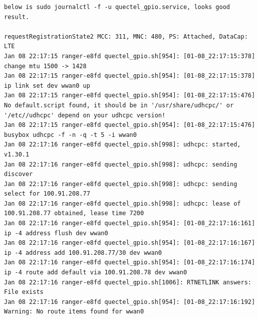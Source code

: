 \documentclass[paper=8.5in:11in, twoside, 12pt, pagesize=pdftex]{book}
\begin{document}
\begin{lstlisting}
below is sudo journalctl -f -u quectel_gpio.service, looks good result. 

requestRegistrationState2 MCC: 311, MNC: 480, PS: Attached, DataCap: LTE
Jan 08 22:17:15 ranger-e8fd quectel_gpio.sh[954]: [01-08_22:17:15:378] change mtu 1500 -> 1428
Jan 08 22:17:15 ranger-e8fd quectel_gpio.sh[954]: [01-08_22:17:15:378] ip link set dev wwan0 up
Jan 08 22:17:15 ranger-e8fd quectel_gpio.sh[954]: [01-08_22:17:15:476] No default.script found, it should be in '/usr/share/udhcpc/' or '/etc//udhcpc' depend on your udhcpc version!
Jan 08 22:17:15 ranger-e8fd quectel_gpio.sh[954]: [01-08_22:17:15:476] busybox udhcpc -f -n -q -t 5 -i wwan0
Jan 08 22:17:16 ranger-e8fd quectel_gpio.sh[998]: udhcpc: started, v1.30.1
Jan 08 22:17:16 ranger-e8fd quectel_gpio.sh[998]: udhcpc: sending discover
Jan 08 22:17:16 ranger-e8fd quectel_gpio.sh[998]: udhcpc: sending select for 100.91.208.77
Jan 08 22:17:16 ranger-e8fd quectel_gpio.sh[998]: udhcpc: lease of 100.91.208.77 obtained, lease time 7200
Jan 08 22:17:16 ranger-e8fd quectel_gpio.sh[954]: [01-08_22:17:16:161] ip -4 address flush dev wwan0
Jan 08 22:17:16 ranger-e8fd quectel_gpio.sh[954]: [01-08_22:17:16:167] ip -4 address add 100.91.208.77/30 dev wwan0
Jan 08 22:17:16 ranger-e8fd quectel_gpio.sh[954]: [01-08_22:17:16:174] ip -4 route add default via 100.91.208.78 dev wwan0
Jan 08 22:17:16 ranger-e8fd quectel_gpio.sh[1006]: RTNETLINK answers: File exists
Jan 08 22:17:16 ranger-e8fd quectel_gpio.sh[954]: [01-08_22:17:16:192] Warning: No route items found for wwan0
\end{lstlisting}
\end{document}
